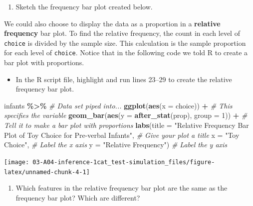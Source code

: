 \documentclass[
]{report}
\newenvironment{Shaded}{\begin{snugshade}}{\end{snugshade}}
\newcommand{\AttributeTok}[1]{\textcolor[rgb]{0.13,0.29,0.53}{#1}}
\newcommand{\CommentTok}[1]{\textcolor[rgb]{0.56,0.35,0.01}{\textit{#1}}}
\newcommand{\DecValTok}[1]{\textcolor[rgb]{0.00,0.00,0.81}{#1}}
\newcommand{\FunctionTok}[1]{\textcolor[rgb]{0.13,0.29,0.53}{\textbf{#1}}}
\newcommand{\NormalTok}[1]{#1}
\newcommand{\SpecialCharTok}[1]{\textcolor[rgb]{0.81,0.36,0.00}{\textbf{#1}}}
\newcommand{\StringTok}[1]{\textcolor[rgb]{0.31,0.60,0.02}{#1}}
\providecommand{\tightlist}{%
  \setlength{\itemsep}{0pt}\setlength{\parskip}{0pt}}
\begin{document}
\begin{enumerate}
\def\labelenumi{\arabic{enumi}.}
\setcounter{enumi}{2}
\tightlist
\item
  Sketch the frequency bar plot created below.
\end{enumerate}

\vspace{1.8in}

We could also choose to display the data as a proportion in a \textbf{relative frequency} bar plot. To find the relative frequency, the count in each level of \texttt{choice} is divided by the sample size. This calculation is the sample proportion for each level of \texttt{choice}. Notice that in the following code we told R to create a bar plot with proportions.

\begin{itemize}
\tightlist
\item
  In the R script file, highlight and run lines 23--29 to create the relative frequency bar plot.
\end{itemize}

\begin{Shaded}
\begin{Highlighting}[]
\NormalTok{infants }\SpecialCharTok{\%\textgreater{}\%} \CommentTok{\# Data set piped into...}
    \FunctionTok{ggplot}\NormalTok{(}\FunctionTok{aes}\NormalTok{(}\AttributeTok{x =}\NormalTok{ choice)) }\SpecialCharTok{+}   \CommentTok{\# This specifies the variable}
    \FunctionTok{geom\_bar}\NormalTok{(}\FunctionTok{aes}\NormalTok{(}\AttributeTok{y =} \FunctionTok{after\_stat}\NormalTok{(prop), }\AttributeTok{group =} \DecValTok{1}\NormalTok{)) }\SpecialCharTok{+}  \CommentTok{\# Tell it to make a bar plot with proportions}
    \FunctionTok{labs}\NormalTok{(}\AttributeTok{title =} \StringTok{"Relative Frequency Bar Plot of Toy Choice for Pre{-}verbal Infants"}\NormalTok{,  }
       \CommentTok{\# Give your plot a title}
       \AttributeTok{x =} \StringTok{"Toy Choice"}\NormalTok{,   }\CommentTok{\# Label the x axis}
       \AttributeTok{y =} \StringTok{"Relative Frequency"}\NormalTok{)  }\CommentTok{\# Label the y axis}
\end{Highlighting}
\end{Shaded}

\begin{center}\texttt{[image: 03-A04-inference-1cat\_test-simulation\_files/figure-latex/unnamed-chunk-4-1]} \end{center}

\begin{enumerate}
\def\labelenumi{\arabic{enumi}.}
\setcounter{enumi}{3}
\tightlist
\item
  Which features in the relative frequency bar plot are the same as the frequency bar plot? Which are different?
\end{enumerate}
\end{document}
